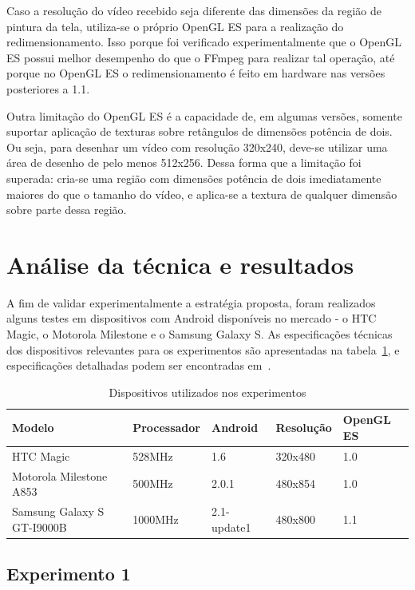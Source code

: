 \documentclass{acm_proc_article-sp}
\begin{document}
Caso a resolução do vídeo recebido seja diferente das dimensões da região de pintura da tela, utiliza-se o próprio OpenGL ES para a realização do redimensionamento. Isso porque foi verificado experimentalmente que o OpenGL ES possui melhor desempenho do que o FFmpeg para realizar tal operação, até porque no OpenGL ES o redimensionamento é feito em hardware nas versões posteriores a 1.1.

Outra limitação do OpenGL ES é a capacidade de, em algumas versões, somente suportar aplicação de texturas sobre retângulos de dimensões potência de dois. Ou seja, para desenhar um vídeo com resolução 320x240, deve-se utilizar uma área de desenho de pelo menos 512x256. Dessa forma que a limitação foi superada: cria-se uma região com dimensões potência de dois imediatamente maiores do que o tamanho do vídeo, e aplica-se a textura de qualquer dimensão sobre parte dessa região.

\section{Análise da técnica e resultados}

A fim de validar experimentalmente a estratégia proposta, foram realizados alguns testes em dispositivos com Android disponíveis no mercado - o HTC Magic, o Motorola Milestone e o Samsung Galaxy S. As especificações técnicas dos dispositivos relevantes para os experimentos são apresentadas na tabela~\ref{tabela_dispositivos}, e especificações detalhadas podem ser encontradas em~\cite{gsm_arena}.

\begin{table}
\centering
\caption{Dispositivos utilizados nos experimentos}
\label{tabela_dispositivos}
\begin{tabular}{|p{1.5cm}|p{1.5cm}|p{1cm}|p{1.5cm}|p{1cm}|} \hline
Modelo&Processador&Android&Resolução&OpenGL ES\\ \hline
HTC Magic&528MHz&1.6&320x480&1.0\\ \hline
Motorola Milestone A853&500MHz&2.0.1&480x854&1.0\\ \hline
Samsung Galaxy S GT-I9000B&1000MHz&2.1-update1&480x800&1.1\\
\hline\end{tabular}
\end{table}

\subsection{Experimento 1}
\end{document}
